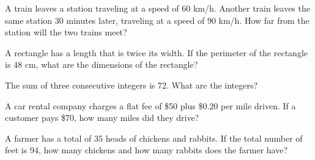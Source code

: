 \documentclass{article}
\theoremstyle{mytheoremstyle}
\theoremstyle{mytheoremstyle}
\theoremstyle{myproblemstyle}
\theoremstyle{myproblemstyle}
\begin{document}
    \begin{problem}
        A train leaves a station traveling at a speed of 60 km/h. Another train leaves the same station 30 minutes later, traveling at a speed of 90 km/h. How far from the station will the two trains meet?
    \end{problem}

    \begin{problem}
        A rectangle has a length that is twice its width. If the perimeter of the rectangle is 48 cm, what are the dimensions of the rectangle?
    \end{problem}

    \begin{problem}
        The sum of three consecutive integers is 72. What are the integers?
    \end{problem}

    \begin{problem}
        A car rental company charges a flat fee of \$50 plus \$0.20 per mile driven. If a customer pays \$70, how many miles did they drive?
    \end{problem}

    \begin{problem}
        A farmer has a total of 35 heads of chickens and rabbits. If the total number of feet is 94, how many chickens and how many rabbits does the farmer have?
    \end{problem}
    
    
\end{document}
